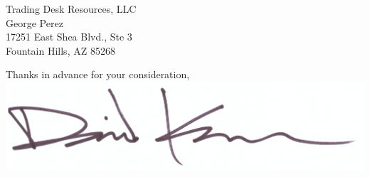 \documentclass{letter}
\begin{document}
\begin{letter}{
  Trading Desk Resources, LLC \\
  George Perez \\
  17251 East Shea Blvd., Ste 3 \\
  Fountain Hills, AZ 85268
}
\closing{
  Thanks in advance for your consideration, \\
  \vspace{.33in}
  \includegraphics[scale=0.33]{signature.png}
}

\end{letter}
\end{document}
